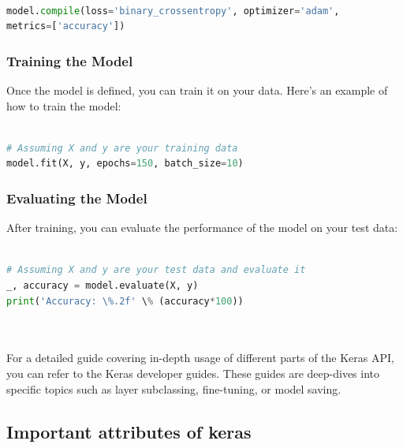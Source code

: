 \begin{lstlisting}[language=python]
	
model.compile(loss='binary_crossentropy', optimizer='adam',
metrics=['accuracy'])

\end{lstlisting}

\subsubsection{Training the Model}

Once the model is defined, you can train it on your data. Here's an example of how to train the model:
	
	\begin{lstlisting}[language=python]
	
# Assuming X and y are your training data
model.fit(X, y, epochs=150, batch_size=10)

\end{lstlisting}

\subsubsection{Evaluating the Model}

After training, you can evaluate the performance of the model on your test data:

	\begin{lstlisting}[language=python]
	
# Assuming X and y are your test data and evaluate it
_, accuracy = model.evaluate(X, y)
print('Accuracy: \%.2f' \% (accuracy*100))

	
\end{lstlisting}

For a detailed guide covering in-depth usage of different parts of the Keras API, you can refer to the Keras developer guides. These guides are deep-dives into specific topics such as layer subclassing, fine-tuning, or model saving.\cite{Keinstall:2024}

\subsection{Important attributes of keras}

